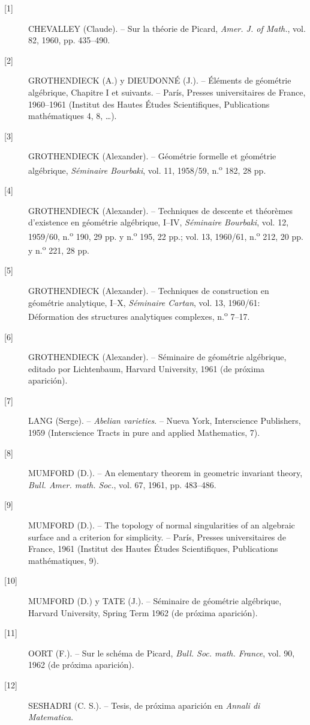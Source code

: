 \begin{description}
\item[{[1]}] CHEVALLEY (Claude). -- Sur la théorie de Picard,
\emph{Amer. J. of Math.}, vol. 82, 1960, pp. 435--490.

\item[{[2]}] GROTHENDIECK (A.) y DIEUDONNÉ (J.). -- Éléments de géométrie
algébrique, Chapitre I et suivants. -- París, Presses universitaires de France,
1960--1961 (Institut des Hautes Études Scientifiques, Publications
mathématiques 4, 8, \ldots).

\item[{[3]}] GROTHENDIECK (Alexander). -- Géométrie formelle et géométrie
algébrique, \emph{Séminaire Bourbaki}, vol. 11, 1958/59,
n.\textsuperscript{o} 182, 28 pp.

\item[{[4]}] GROTHENDIECK (Alexander). -- Techniques de descente et théorèmes
d'existence en géométrie algébrique, I--IV, \emph{Séminaire Bourbaki}, vol. 12,
1959/60, n.\textsuperscript{o} 190, 29 pp. y n.\textsuperscript{o} 195, 22 pp.;
vol. 13, 1960/61, n.\textsuperscript{o} 212, 20 pp. y
n.\textsuperscript{o} 221, 28 pp.

\item[{[5]}] GROTHENDIECK (Alexander). -- Techniques de construction en
géométrie analytique, I--X, \emph{Séminaire Cartan}, vol. 13, 1960/61:
Déformation des structures analytiques complexes,
n.\textsuperscript{o} 7--17.

\item[{[6]}] GROTHENDIECK (Alexander). -- Séminaire de géométrie algébrique,
editado por Lichtenbaum, Harvard University, 1961 (de próxima aparición).

\item[{[7]}] LANG (Serge). -- \emph{Abelian varieties}. -- Nueva York,
Interscience Publishers, 1959 (Interscience Tracts in pure and applied
Mathematics, 7).

\item[{[8]}] MUMFORD (D.). -- An elementary theorem in geometric invariant
theory, \emph{Bull. Amer. math. Soc.}, vol. 67, 1961, pp. 483--486.

\item[{[9]}] MUMFORD (D.). -- The topology of normal singularities of an
algebraic surface and a criterion for simplicity. -- París, Presses
universitaires de France, 1961 (Institut des Hautes Études Scientifiques,
Publications mathématiques, 9).

\item[{[10]}] MUMFORD (D.) y TATE (J.). -- Séminaire de géométrie algébrique,
Harvard University, Spring Term 1962 (de próxima aparición).

\item[{[11]}] OORT (F.). -- Sur le schéma de Picard,
\emph{Bull. Soc. math. France}, vol. 90, 1962 (de próxima aparición).

\item[{[12]}] SESHADRI (C. S.). -- Tesis, de próxima aparición en
\emph{Annali di Matematica}.
\end{description}
